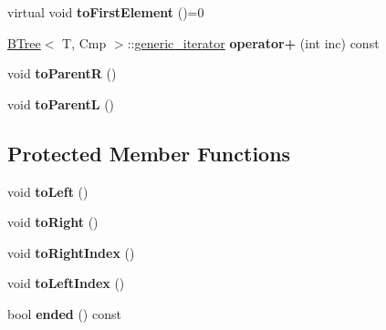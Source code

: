 \begin{DoxyCompactItemize}
\item 
\hypertarget{classBTree_1_1generic__iterator_ae1c991373b31b55adc78ec7102ed9c90}{
virtual void {\bfseries toFirstElement} ()=0}
\label{classBTree_1_1generic__iterator_ae1c991373b31b55adc78ec7102ed9c90}

\item 
\hypertarget{classBTree_1_1generic__iterator_a4609b12d5eb6066ebb0ef190bc289c81}{
\hyperlink{classBTree}{BTree}$<$ T, Cmp $>$::\hyperlink{classBTree_1_1generic__iterator}{generic\_\-iterator} {\bfseries operator+} (int inc) const }
\label{classBTree_1_1generic__iterator_a4609b12d5eb6066ebb0ef190bc289c81}

\item 
\hypertarget{classBTree_1_1generic__iterator_a92fb0c845dfeb8215d985b517e705947}{
void {\bfseries toParentR} ()}
\label{classBTree_1_1generic__iterator_a92fb0c845dfeb8215d985b517e705947}

\item 
\hypertarget{classBTree_1_1generic__iterator_acd2d74ca5d26a768e4ac92f8f02e7ca9}{
void {\bfseries toParentL} ()}
\label{classBTree_1_1generic__iterator_acd2d74ca5d26a768e4ac92f8f02e7ca9}

\end{DoxyCompactItemize}
\subsection*{Protected Member Functions}
\begin{DoxyCompactItemize}
\item 
\hypertarget{classBTree_1_1generic__iterator_aea0f779e6ae033a0b7a18ead33e5aeff}{
void {\bfseries toLeft} ()}
\label{classBTree_1_1generic__iterator_aea0f779e6ae033a0b7a18ead33e5aeff}

\item 
\hypertarget{classBTree_1_1generic__iterator_af3a3333fcf42f653efa5467a67387b79}{
void {\bfseries toRight} ()}
\label{classBTree_1_1generic__iterator_af3a3333fcf42f653efa5467a67387b79}

\item 
\hypertarget{classBTree_1_1generic__iterator_a511c737c31dda772fef150ad08216170}{
void {\bfseries toRightIndex} ()}
\label{classBTree_1_1generic__iterator_a511c737c31dda772fef150ad08216170}

\item 
\hypertarget{classBTree_1_1generic__iterator_a2357a1bf57af64373d98b1ad42e5fb3a}{
void {\bfseries toLeftIndex} ()}
\label{classBTree_1_1generic__iterator_a2357a1bf57af64373d98b1ad42e5fb3a}

\item 
\hypertarget{classBTree_1_1generic__iterator_a49aef3d72dbb1fe06c35da037b499082}{
bool {\bfseries ended} () const }
\label{classBTree_1_1generic__iterator_a49aef3d72dbb1fe06c35da037b499082}

\end{DoxyCompactItemize}
